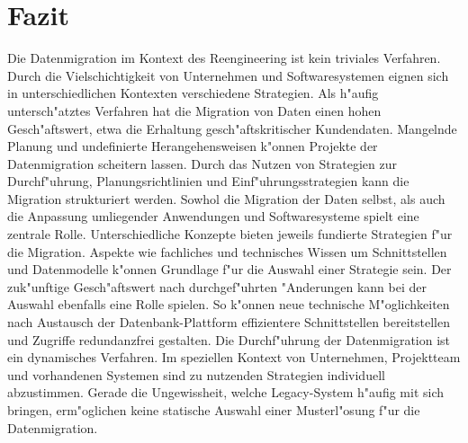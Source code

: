 \section{Fazit}
\label{chapter:fazit}

Die Datenmigration im Kontext des Reengineering ist kein triviales Verfahren. Durch die Vielschichtigkeit von Unternehmen und Softwaresystemen eignen sich in unterschiedlichen Kontexten verschiedene Strategien. Als h"aufig untersch"atztes Verfahren hat die Migration von Daten einen hohen Gesch"aftswert, etwa die Erhaltung gesch"aftskritischer Kundendaten. Mangelnde Planung und undefinierte Herangehensweisen k"onnen Projekte der Datenmigration scheitern lassen. Durch das Nutzen von Strategien zur Durchf"uhrung, Planungsrichtlinien und Einf"uhrungsstrategien kann die Migration strukturiert werden.
\lb
Sowhol die Migration der Daten selbst, als auch die Anpassung umliegender Anwendungen und Softwaresysteme spielt eine zentrale Rolle. Unterschiedliche Konzepte bieten jeweils fundierte Strategien f"ur die Migration. Aspekte wie fachliches und technisches Wissen um Schnittstellen und Datenmodelle k"onnen Grundlage f"ur die Auswahl einer Strategie sein. Der zuk"unftige Gesch"aftswert nach durchgef"uhrten "Anderungen kann bei der Auswahl ebenfalls eine Rolle spielen. So k"onnen neue technische M"oglichkeiten nach Austausch der Datenbank-Plattform effizientere Schnittstellen bereitstellen und Zugriffe redundanzfrei gestalten.
\lb
\lb
Die Durchf"uhrung der Datenmigration ist ein dynamisches Verfahren. Im speziellen Kontext von Unternehmen, Projektteam und vorhandenen Systemen sind zu nutzenden Strategien individuell abzustimmen. Gerade die Ungewissheit, welche Legacy-System h"aufig mit sich bringen, erm"oglichen keine statische Auswahl einer Musterl"osung f"ur die Datenmigration.